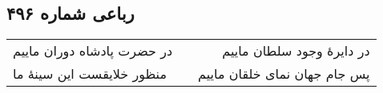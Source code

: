 \begin{center}
\section*{رباعی شماره ۴۹۶}
\label{sec:sh496}
\begin{longtable}{l p{0.5cm} r}
در حضرت پادشاه دوران ماییم
&&
در دایرهٔ وجود سلطان ماییم
\\
منظور خلایقست این سینهٔ ما
&&
پس جام جهان نمای خلقان ماییم
\\
\end{longtable}
\end{center}
